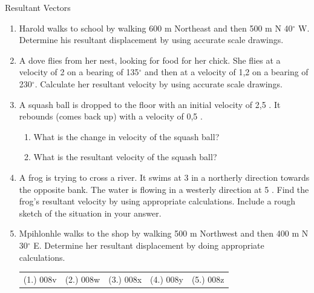 \begin{exercises}{Resultant Vectors}{ \noindent\vspace{-1cm}
\begin{enumerate}[noitemsep, label=\textbf{\arabic*}.]
\item Harold walks to school by walking 600 m Northeast and then 500 m N 40$^\circ$ W. Determine his resultant displacement by using accurate scale drawings.
\item A dove flies from her nest, looking for food for her chick. She flies at a velocity of 2 \ms on a bearing of 135$^\circ$ and then at a velocity of 1,2 \ms on a bearing of 230$^\circ$. Calculate her resultant velocity by using accurate scale drawings.
\item A squash ball is dropped to the floor with an initial velocity of 2,5 \ms. It rebounds (comes back up) with a velocity of 0,5 \ms. \begin{enumerate}
	\item What is the change in velocity of the squash ball?
	\item What is the resultant velocity of the squash ball?
	\end{enumerate}
\item A frog is trying to cross a river. It swims at 3 \ms in a northerly direction towards the opposite bank. The water is flowing in a westerly direction at 5 \ms. Find the frog's resultant velocity by using appropriate calculations. Include a rough sketch of the situation in your answer.
\item Mpihlonhle walks to the shop by walking 500 m Northwest and then 400 m N 30$^\circ$ E. Determine her resultant displacement by doing appropriate calculations.
  \label{59e414b70efc194a27a122db47d06ce6**end}
\par \practiceinfo
 \par \begin{tabular}[h]{ccccc}
 (1.) 008v  &  (2.) 008w  &  (3.) 008x &  (4.) 008y  &  (5.) 008z\end{tabular}
\end{enumerate}
}
\end{exercises}



